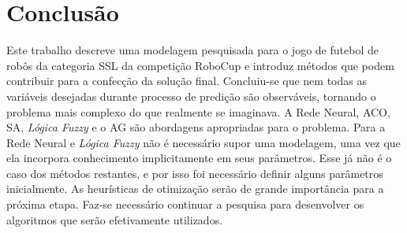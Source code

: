 \chapter{Conclusão}\label{cap:conclusao}

Este trabalho descreve uma modelagem pesquisada para o jogo de futebol de robôs da
categoria SSL da competição RoboCup e introduz métodos que podem
contribuir para a confecção da solução final. Concluiu-se que nem todas as variáveis
desejadas durante  processo de predição são observáveis, tornando o problema mais
complexo do que realmente se imaginava. A Rede Neural, ACO, SA, \textit{Lógica Fuzzy}
e o AG são abordagens apropriadas para o problema. Para a Rede Neural e \textit{Lógica Fuzzy}
não é necessário supor uma modelagem, uma vez que ela incorpora conhecimento
implicitamente em seus parâmetros. Esse já não é o caso dos métodos restantes, e por isso
foi necessário definir alguns parâmetros inicialmente. As heurísticas de otimização
serão de grande importância para a próxima etapa. Faz-se necessário continuar a
pesquisa para desenvolver os algoritmos que serão efetivamente utilizados.

